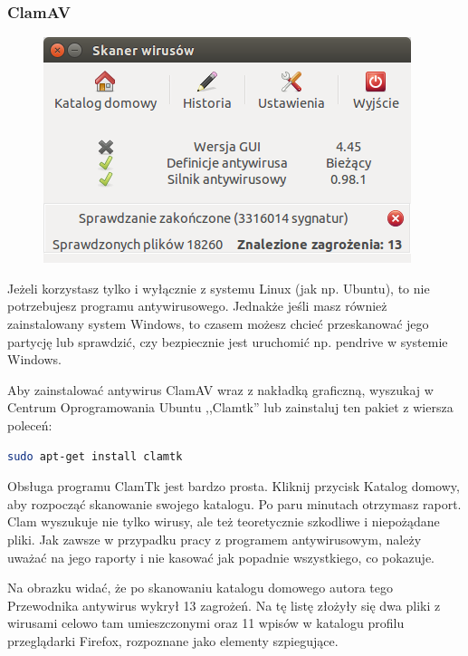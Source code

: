 \subsubsection{ClamAV}
\begin{figure}
	\vspace{-10pt}
	\includegraphics[width=\linewidth]{images/programy_clam.png}
\end{figure}

Jeżeli korzystasz tylko i wyłącznie z systemu Linux (jak np. Ubuntu), to nie potrzebujesz programu antywirusowego. Jednakże jeśli masz również zainstalowany system Windows, to czasem możesz chcieć przeskanować jego partycję lub sprawdzić, czy bezpiecznie jest uruchomić np. pendrive w systemie Windows.

Aby zainstalować antywirus \textcolor{ubuntu_orange}{ClamAV} wraz z nakładką graficzną, wyszukaj w Centrum Oprogramowania Ubuntu ,,Clamtk'' lub zainstaluj ten pakiet z wiersza poleceń:
\begin{lstlisting}[language=bash]
sudo apt-get install clamtk
\end{lstlisting}

Obsługa programu ClamTk jest bardzo prosta. Kliknij przycisk \textcolor{ubuntu_orange}{Katalog domowy}, aby rozpocząć skanowanie swojego katalogu. Po paru minutach otrzymasz raport. Clam wyszukuje nie tylko wirusy, ale też teoretycznie szkodliwe i niepożądane pliki. Jak zawsze w przypadku pracy z programem antywirusowym, należy uważać na jego raporty i nie kasować jak popadnie wszystkiego, co pokazuje.

Na obrazku widać, że po skanowaniu katalogu domowego autora tego Przewodnika antywirus wykrył 13 zagrożeń. Na tę listę złożyły się dwa pliki z wirusami celowo tam umieszczonymi oraz 11 wpisów w katalogu profilu przeglądarki Firefox, rozpoznane jako elementy szpiegujące.

